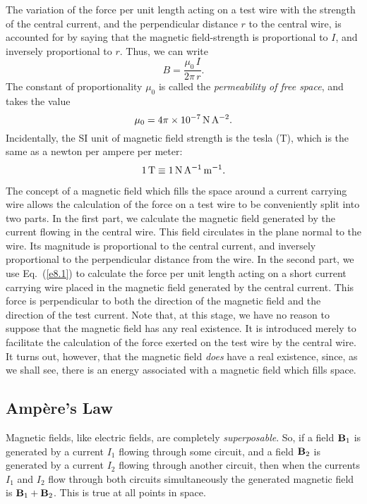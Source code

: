 The variation of the force per unit length acting on
a test wire with the strength of the 
central current, and the perpendicular distance $r$ to the central wire, is 
accounted for by saying that the magnetic field-strength is proportional to $I$, and
inversely proportional to $r$. Thus, we can write 
\begin{equation}
B = \frac{\mu_0\,I}
{2 \pi\, r}.
\end{equation}
The constant of proportionality $\mu_0$ is called the
{\em permeability of free space}, and takes the value
\begin{equation}
\mu_0 = 4\pi \times 10^{-7}\,{\rm N\,A^{-2}}.
\end{equation}
Incidentally, the SI unit of magnetic field strength is the tesla (T), which is the
same as a newton per ampere per meter:
\begin{equation}
1\,{\rm T} \equiv 1\,{\rm N}\,{\rm A}^{-1}\,{\rm m}^{-1}.
\end{equation}

The concept of a magnetic field which
fills the space around a current carrying wire
allows the calculation of the force on a test
wire to be conveniently split into two parts. In the first part, we calculate the
magnetic field generated by the current flowing in the central wire. This field
circulates  in the plane normal to the wire. Its magnitude is
proportional to the central current, and inversely proportional to the  perpendicular
distance from the wire. In the second part, we use
Eq.~(\ref{e8.1}) to calculate the force per unit
length acting on a
short current carrying wire placed in the magnetic field 
generated by the central current.
This force is perpendicular to both the direction of the magnetic field and the direction of the
test current. Note that, at this stage, we have no reason to suppose that the magnetic
field has any real existence. It is introduced merely to facilitate the calculation
of the  force exerted  on  the test wire by the central wire. It turns out, however,
that the magnetic field {\em does}\/ have a real existence, since, as we shall see, there is
an energy associated with a magnetic field which fills space. 

\subsection{Amp\`{e}re's Law}
Magnetic fields, like electric fields, are completely 
{\em superposable}. So, if
a field ${\bf B}_1$ is generated by a current $I_1$ flowing through some circuit,
and a field ${\bf B}_2$ is generated by a current $I_2$ flowing through another
 circuit, then when the currents $I_1$ and $I_2$ flow through both circuits
simultaneously the generated magnetic field is ${\bf B}_1+{\bf B}_2$.
This is true at all points in space.

